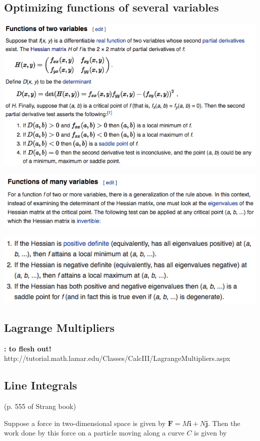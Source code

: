 \documentclass{article}
\begin{document}
\subsection{Optimizing functions of several variables}

\includegraphics[scale=0.65]{hessian1}

\includegraphics[scale=0.65]{hessian2}

\includegraphics[scale=0.65]{hessian3}

\subsection{Lagrange Multipliers} \textbf{: to flesh out!} http://tutorial.math.lamar.edu/Classes/CalcIII/LagrangeMultipliers.aspx

\subsection{Line Integrals} (p. 555 of Strang book)

Suppose a force in two-dimensional space is given by \(\boldsymbol{F} = M\boldsymbol{i} + N \boldsymbol{j}\). Then the work done by this force on a particle moving along a curve \(C\) is given by
\end{document}
